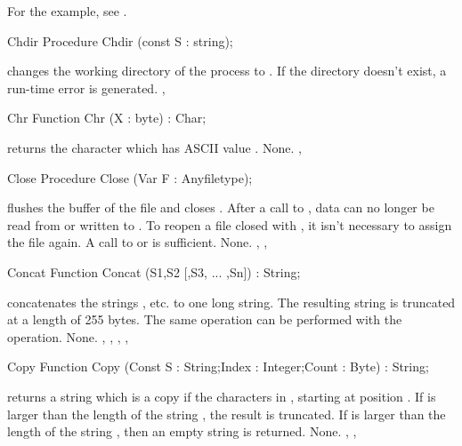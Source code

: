 \documentclass{report}
\begin{document}
For the example, see .
\begin{procedure}{Chdir}
\Declaration
Procedure Chdir (const S : string);

\Description
{} changes the working directory of the process to .
\Errors
If the directory  doesn't exist, a run-time error is generated.
\SeeAlso
{}, 
\end{procedure}
\html{}
\begin{function}{Chr}
\Declaration
Function Chr (X : byte) : Char;

\Description
{} returns the character which has ASCII value .
\Errors
None.
\SeeAlso
{},
\end{function}
\html{}
\begin{procedure}{Close}
\Declaration
Procedure Close (Var F : Anyfiletype);

\Description
{} flushes the buffer of the file  and closes .
After a call to , data can no longer be read from or written to
.
To reopen a file closed with , it isn't necessary to assign the
file again. A call to  or  is sufficient.
\Errors
None.
\SeeAlso
{}, , 
\end{procedure}
\html{}
\begin{function}{Concat}
\Declaration
Function Concat (S1,S2 [,S3, ... ,Sn]) : String;

\Description
{} concatenates the strings , etc. to one long
string. The resulting string is truncated at a length of 255 bytes.
The same operation can be performed with the \var{+} operation.
\Errors
None.
\SeeAlso
{}, , , , 
\end{function}
\html{}
\begin{function}{Copy}
\Declaration
Function Copy (Const S : String;Index : Integer;Count : Byte) : String;

\Description
{} returns a string which is a copy if the  characters
in , starting at position . If  is larger than
the length of the string , the result is truncated. 
If  is larger than the length of the string , then an
empty string is returned.
\Errors
None.
\SeeAlso
{}, , 
\end{function}
\end{document}
